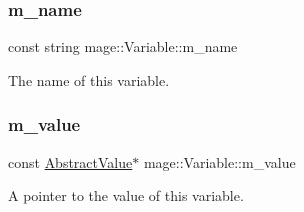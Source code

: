 \subsubsection{\texorpdfstring{m\+\_\+name}{m\_name}}
{\footnotesize\ttfamily const string mage\+::\+Variable\+::m\+\_\+name\hspace{0.3cm}{\ttfamily [private]}}

The name of this variable. \hypertarget{structmage_1_1_variable_a99388f3fbccf983b8d6954fd31d0eb27}{}\label{structmage_1_1_variable_a99388f3fbccf983b8d6954fd31d0eb27} 
\subsubsection{\texorpdfstring{m\+\_\+value}{m\_value}}
{\footnotesize\ttfamily const \hyperlink{structmage_1_1_variable_1_1_abstract_value}{Abstract\+Value}$\ast$ mage\+::\+Variable\+::m\+\_\+value\hspace{0.3cm}{\ttfamily [private]}}

A pointer to the value of this variable. 